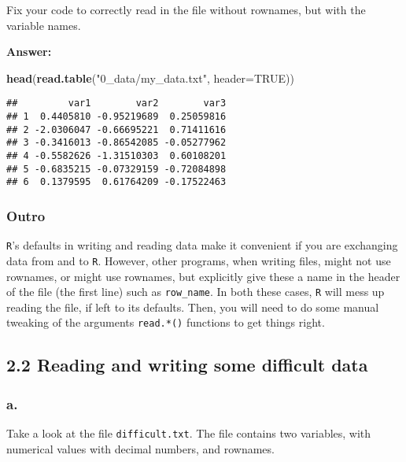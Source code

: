 \documentclass[]{article}
\newenvironment{Shaded}{\begin{snugshade}}{\end{snugshade}}
\newcommand{\DataTypeTok}[1]{\textcolor[rgb]{0.13,0.29,0.53}{#1}}
\newcommand{\KeywordTok}[1]{\textcolor[rgb]{0.13,0.29,0.53}{\textbf{#1}}}
\newcommand{\NormalTok}[1]{#1}
\newcommand{\OtherTok}[1]{\textcolor[rgb]{0.56,0.35,0.01}{#1}}
\newcommand{\StringTok}[1]{\textcolor[rgb]{0.31,0.60,0.02}{#1}}
\begin{document}
Fix your code to correctly read in the file without rownames, but with
the variable names.

\textbf{Answer:}

\begin{Shaded}
\begin{Highlighting}[]
\KeywordTok{head}\NormalTok{(}\KeywordTok{read.table}\NormalTok{(}\StringTok{"0_data/my_data.txt"}\NormalTok{, }\DataTypeTok{header=}\OtherTok{TRUE}\NormalTok{))}
\end{Highlighting}
\end{Shaded}

\begin{verbatim}
##         var1        var2        var3
## 1  0.4405810 -0.95219689  0.25059816
## 2 -2.0306047 -0.66695221  0.71411616
## 3 -0.3416013 -0.86542085 -0.05277962
## 4 -0.5582626 -1.31510303  0.60108201
## 5 -0.6835215 -0.07329159 -0.72084898
## 6  0.1379595  0.61764209 -0.17522463
\end{verbatim}

\hypertarget{outro-1}{%
\subsubsection{Outro}\label{outro-1}}

\texttt{R}'s defaults in writing and reading data make it convenient if
you are exchanging data from and to \texttt{R}. However, other programs,
when writing files, might not use rownames, or might use rownames, but
explicitly give these a name in the header of the file (the first line)
such as \texttt{row\_name}. In both these cases, \texttt{R} will mess up
reading the file, if left to its defaults. Then, you will need to do
some manual tweaking of the arguments \texttt{read.*()} functions to get
things right.

\hypertarget{reading-and-writing-some-difficult-data}{%
\subsection{2.2 Reading and writing some difficult
data}\label{reading-and-writing-some-difficult-data}}

\hypertarget{a.-5}{%
\subsubsection{a.}\label{a.-5}}

Take a look at the file \texttt{difficult.txt}. The file contains two
variables, with numerical values with decimal numbers, and rownames.
\end{document}
